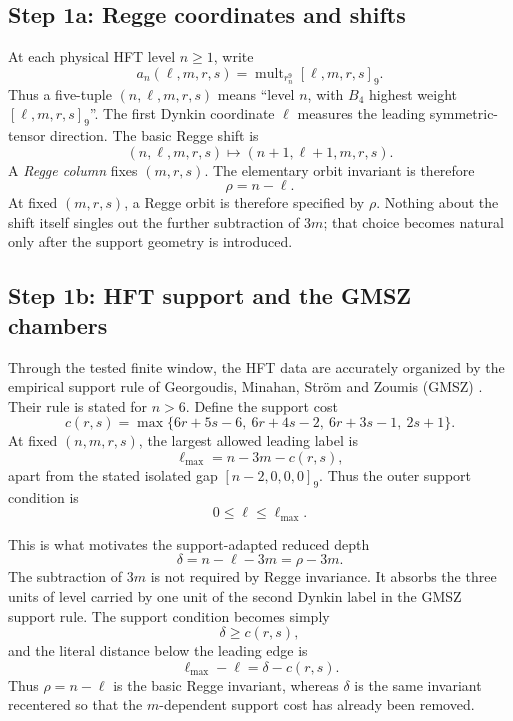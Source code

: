 \documentclass[11pt,a4paper]{article}
\theoremstyle{definition}
\begin{document}
\subsection{Step 1a: Regge coordinates and shifts}

At each physical HFT level $n\geq1$, write
\[
 a_n(\ell,m,r,s)
 =\operatorname{mult}_{r_n^9}[\ell,m,r,s]_9.
\]
Thus a five-tuple $(n,\ell,m,r,s)$ means ``level $n$, with $B_4$ highest
weight $[\ell,m,r,s]_9$''.  The first Dynkin coordinate $\ell$ measures the
leading symmetric-tensor direction.  The basic Regge shift is
\begin{equation}
\label{eq:regge-shift}
   (n,\ell,m,r,s)\longmapsto(n+1,\ell+1,m,r,s).
\end{equation}
A \emph{Regge column} fixes $(m,r,s)$.  The elementary orbit invariant is
therefore
\[
   \rho=n-\ell.
\]
At fixed $(m,r,s)$, a Regge orbit is therefore specified by $\rho$.  Nothing
about the shift itself singles out the further subtraction of $3m$; that
choice becomes natural only after the support geometry is introduced.

\subsection{Step 1b: HFT support and the GMSZ chambers}

Through the tested finite window, the HFT data are accurately organized by
the empirical support rule of Georgoudis, Minahan, Str\"om and Zoumis (GMSZ)
\cite{GMSZ}.  Their rule is stated for $n>6$.  Define the support cost
\[
 c(r,s)=\max\{6r+5s-6,\ 6r+4s-2,\ 6r+3s-1,\ 2s+1\}.
\]
At fixed $(n,m,r,s)$, the largest allowed leading label is
\[
 \ell_{\max}=n-3m-c(r,s),
\]
apart from the stated isolated gap $[n-2,0,0,0]_9$.  Thus the outer support
condition is
\[
 0\leq\ell\leq\ell_{\max}.
\]

This is what motivates the support-adapted reduced depth
\[
   \delta=n-\ell-3m=\rho-3m.
\]
The subtraction of $3m$ is not required by Regge invariance.  It absorbs the
three units of level carried by one unit of the second Dynkin label in the
GMSZ support rule.  The support condition becomes simply
\[
 \delta\geq c(r,s),
\]
and the literal distance below the leading edge is
\[
 \ell_{\max}-\ell=\delta-c(r,s).
\]
Thus $\rho=n-\ell$ is the basic Regge invariant, whereas $\delta$ is the
same invariant recentered so that the $m$-dependent support cost has already
been removed.
\end{document}
